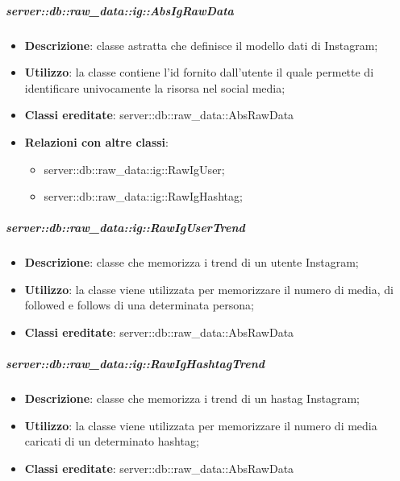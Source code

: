 		
		\subparagraph{server::db::raw\_data::ig::AbsIgRawData} %
		\label{subp:server_db_raw_data_ig_absigrawdata}
			\begin{itemize}
				\item \textbf{Descrizione}: classe astratta che definisce il modello dati di Instagram;
				\item \textbf{Utilizzo}: la classe contiene l'id fornito dall'utente il quale permette di identificare univocamente la risorsa nel social media;
				\item \textbf{Classi ereditate}: server::db::raw\_data::AbsRawData
				\item \textbf{Relazioni con altre classi}:
					\begin{itemize}
						\item server::db::raw\_data::ig::RawIgUser;
						\item server::db::raw\_data::ig::RawIgHashtag;
					\end{itemize}
			\end{itemize}


		\subparagraph{server::db::raw\_data::ig::RawIgUserTrend} %
		\label{subp:server_db_raw_data_ig_rawigusertrend}
			\begin{itemize}
				\item \textbf{Descrizione}: classe che memorizza i trend di un utente Instagram;
				\item \textbf{Utilizzo}: la classe viene utilizzata per memorizzare il numero di media, di followed e follows di una determinata persona;
				\item \textbf{Classi ereditate}: server::db::raw\_data::AbsRawData
			\end{itemize}


		\subparagraph{server::db::raw\_data::ig::RawIgHashtagTrend} %
		\label{subp:server_db_raw_data_ig_rawighashtagtrend}
			\begin{itemize}
				\item \textbf{Descrizione}: classe che memorizza i trend di un hastag Instagram;
				\item \textbf{Utilizzo}: la classe viene utilizzata per memorizzare il numero di media caricati di un determinato hashtag;
				\item \textbf{Classi ereditate}: server::db::raw\_data::AbsRawData
			\end{itemize}




